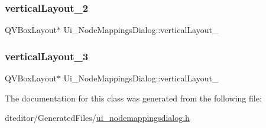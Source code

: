 \subsubsection{\texorpdfstring{verticalLayout\_2}{verticalLayout\_2}}
{\footnotesize\ttfamily Q\+V\+Box\+Layout$\ast$ Ui\+\_\+\+Node\+Mappings\+Dialog\+::vertical\+Layout\+\_}

\mbox{\label{class_ui___node_mappings_dialog_a2e6297b6d6c5657f7dca4f237f0bad1e}} 
\subsubsection{\texorpdfstring{verticalLayout\_3}{verticalLayout\_3}}
{\footnotesize\ttfamily Q\+V\+Box\+Layout$\ast$ Ui\+\_\+\+Node\+Mappings\+Dialog\+::vertical\+Layout\+\_}



The documentation for this class was generated from the following file\+:\begin{DoxyCompactItemize}
\item 
dteditor/\+Generated\+Files/\mbox{\hyperlink{ui__nodemappingsdialog_8h}{ui\+\_\+nodemappingsdialog.\+h}}\end{DoxyCompactItemize}
